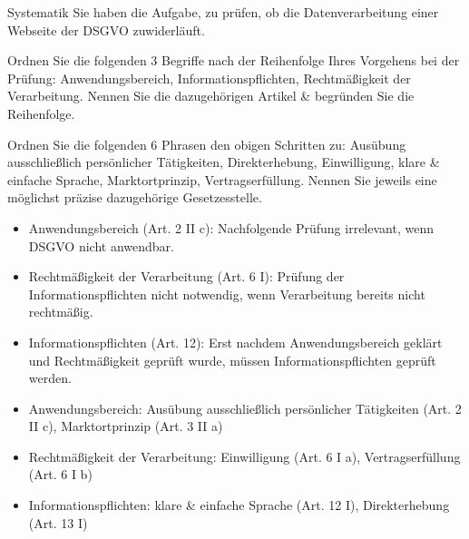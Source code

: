 \documentclass{exercisesheet}
\begin{document}
\begin{eexercises}{Systematik}{
    Sie haben die Aufgabe, zu prüfen, ob die Datenverarbeitung einer Webseite der DSGVO zuwiderläuft.
  }
  \item Ordnen Sie die folgenden 3 Begriffe nach der Reihenfolge Ihres Vorgehens bei der Prüfung: Anwendungsbereich, Informationspflichten, Rechtmäßigkeit der Verarbeitung. Nennen Sie die dazugehörigen Artikel \& begründen Sie die Reihenfolge.
  \item Ordnen Sie die folgenden 6 Phrasen den obigen Schritten zu: Ausübung ausschließlich persönlicher Tätigkeiten, Direkterhebung, Einwilligung, klare \& einfache Sprache, Marktortprinzip, Vertragserfüllung. Nennen Sie jeweils eine möglichst präzise dazugehörige Gesetzesstelle.
\end{eexercises}

\begin{solutions}
  \item
  \begin{itemize}
    \item Anwendungsbereich (Art. 2 II c): Nachfolgende Prüfung irrelevant, wenn DSGVO nicht anwendbar.
    \item Rechtmäßigkeit der Verarbeitung (Art. 6 I): Prüfung der Informationspflichten nicht notwendig, wenn Verarbeitung bereits nicht rechtmäßig.
    \item Informationspflichten (Art. 12): Erst nachdem Anwendungsbereich geklärt und Rechtmäßigkeit geprüft wurde, müssen Informationspflichten geprüft werden.
  \end{itemize}
  \item
  \begin{itemize}
    \item Anwendungsbereich: Ausübung ausschließlich persönlicher Tätigkeiten (Art. 2 II c), Marktortprinzip (Art. 3 II a)
    \item Rechtmäßigkeit der Verarbeitung: Einwilligung (Art. 6 I a), Vertragserfüllung (Art. 6 I b)
    \item Informationspflichten: klare \& einfache Sprache (Art. 12 I), Direkterhebung (Art. 13 I)
  \end{itemize}
\end{solutions}
\end{document}
